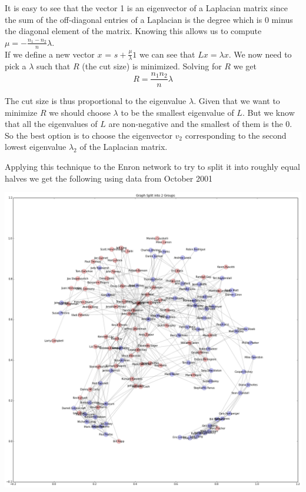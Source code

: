 \documentclass[12pt]{article}
\begin{document}
	It is easy to see that the vector 1 is an eigenvector of a Laplacian matrix since the sum of the off-diagonal entries of a Laplacian is the degree which is 0 minus the diagonal element of the matrix. Knowing this allows us to compute $\mu = - \frac{n_1 - n_2}{n} \lambda$. \\
	
	If we define a new vector $x$ = $s + \frac{\mu}{\lambda} 1$ we can see that $L x = \lambda x$. We now need to pick a $\lambda$ such that $R$ (the cut size) is minimized. Solving for $R$ we get
	\begin{equation}
		R = \frac{n_1 n_2}{n} \lambda
	\end{equation}
	
	The cut size is thus proportional to the eigenvalue $\lambda$. Given that we want to minimize $R$ we should choose $\lambda$ to be the smallest eigenvalue of $L$. But we know that all the eigenvalues of $L$ are non-negative and the smallest of them is the 0.  So the best option is to choose the eigenvector $v_2$ corresponding to the second lowest eigenvalue $\lambda_2$ of the Laplacian matrix. 

	Applying this technique to the Enron network to try to split it into roughly equal halves we get the following using data from October 2001
	
	\includegraphics[width=1\textwidth]{figureEnronPartition}
	
\end{document}
